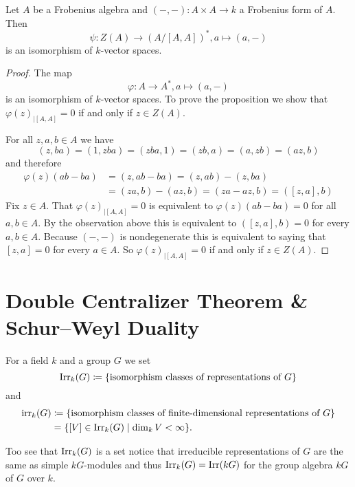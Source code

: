 \begin{prop}
  Let $A$ be a Frobenius algebra and $(-,-) \colon A \times A \to k$ a Frobenius form of $A$. Then
  \[
    \psi \colon Z(A) \to (A/[A,A])^*, a \mapsto (a,-)
  \]
  is an isomorphism of $k$-vector spaces.
\end{prop}
\begin{proof}
  The map
  \[
    \varphi \colon A \to A^*, a \mapsto (a, -)
  \]
  is an isomorphism of $k$-vector spaces. To prove the proposition we show that $\varphi(z)_{|[A,A]} = 0$ if and only if $z \in Z(A)$.
  
  For all $z, a, b \in A$ we have
  \[
    (z,ba) = (1,zba) = (zba,1) = (zb,a) = (a,zb) = (az,b)
  \]
  and therefore
  \begin{align*}
    \varphi(z)(ab-ba)
    &= (z,ab-ba)
    = (z,ab) - (z,ba) \\
    &= (za,b) - (az,b)
    = (za-az,b)
    = ([z,a],b)
  \end{align*}
  Fix $z \in A$. That $\varphi(z)_{|[A,A]} = 0$ is equivalent to $\varphi(z)(ab-ba) = 0$ for all $a,b \in A$. By the observation above this is equivalent to $([z,a],b) = 0$ for every $a,b \in A$. Because $(-,-)$ is nondegenerate this is equivalent to saying that $[z,a] = 0$ for every $a \in A$. So $\varphi(z)_{|[A,A]} = 0$ if and only if $z \in Z(A)$.
\end{proof}





\section{Double Centralizer Theorem \& Schur--Weyl Duality}


\begin{defi}
  For a field $k$ and a group $G$ we set
  \[
    \operatorname{Irr}_k(G) \coloneqq \{\text{isomorphism classes of representations of $G$}\}
  \]
  and
  \begin{align*}
    \operatorname{irr}_k(G)
    &\coloneqq \{\text{isomorphism classes of finite-dimensional representations of $G$}\} \\
    &= \{[V] \in \operatorname{Irr}_k(G) \mid \dim_k V < \infty\}.
  \end{align*}
\end{defi}


Too see that $\operatorname{Irr}_k(G)$ is a set notice that irreducible representations of $G$ are the same as simple $kG$-modules and thus $\operatorname{Irr}_k(G) = \operatorname{Irr}(kG)$ for the group algebra $kG$ of $G$ over $k$.



